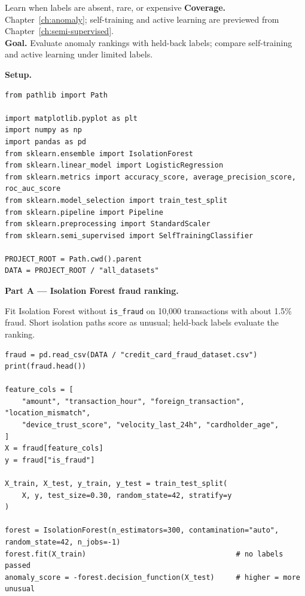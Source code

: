 
\begin{labproject}{Learn when labels are absent, rare, or expensive}
\textbf{Coverage.} Chapter~\ref{ch:anomaly}; self-training and active learning are previewed from Chapter~\ref{ch:semi-supervised}.\\
\textbf{Goal.} Evaluate anomaly rankings with held-back labels; compare self-training and active learning under limited labels.

\medskip\noindent\textbf{Setup.}\par
\begin{lstlisting}[style=utppython]
from pathlib import Path

import matplotlib.pyplot as plt
import numpy as np
import pandas as pd
from sklearn.ensemble import IsolationForest
from sklearn.linear_model import LogisticRegression
from sklearn.metrics import accuracy_score, average_precision_score, roc_auc_score
from sklearn.model_selection import train_test_split
from sklearn.pipeline import Pipeline
from sklearn.preprocessing import StandardScaler
from sklearn.semi_supervised import SelfTrainingClassifier

PROJECT_ROOT = Path.cwd().parent
DATA = PROJECT_ROOT / "all_datasets"
\end{lstlisting}

\medskip\noindent\textbf{Part A --- Isolation Forest fraud ranking.}\par

Fit Isolation Forest without \texttt{is\_fraud} on 10,000 transactions with about 1.5\% fraud. Short isolation paths score as unusual; held-back labels evaluate the ranking.

\begin{lstlisting}[style=utppython]
fraud = pd.read_csv(DATA / "credit_card_fraud_dataset.csv")
print(fraud.head())

feature_cols = [
    "amount", "transaction_hour", "foreign_transaction", "location_mismatch",
    "device_trust_score", "velocity_last_24h", "cardholder_age",
]
X = fraud[feature_cols]
y = fraud["is_fraud"]

X_train, X_test, y_train, y_test = train_test_split(
    X, y, test_size=0.30, random_state=42, stratify=y
)

forest = IsolationForest(n_estimators=300, contamination="auto", random_state=42, n_jobs=-1)
forest.fit(X_train)                                   # no labels passed
anomaly_score = -forest.decision_function(X_test)     # higher = more unusual
\end{lstlisting}


\end{labproject}
